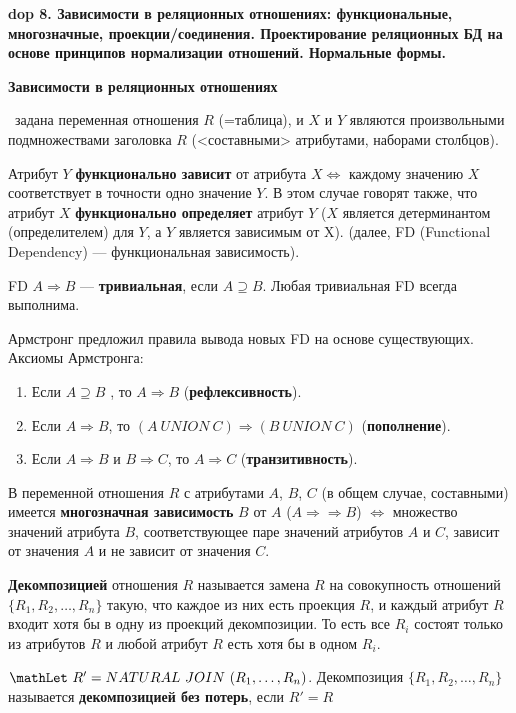 \textbf{\LARGE dop 8. Зависимости  в  реляционных  отношениях:  функциональные,  многозначные,  проекции/соединения. Проектирование реляционных БД на основе принципов нормализации отношений. Нормальные формы.}

\textbf{Зависимости в реляционных отношениях}

\mathLet \ задана переменная отношения $R$ (=таблица), и $X$ и $Y$ являются произвольными подмножествами заголовка $R$ (<составными> атрибутами, наборами столбцов).

Атрибут $Y$ \textbf{функционально зависит} от атрибута $X \iff$ каждому значению $X$ соответствует в точности одно значение $Y$.
В этом случае говорят также, что атрибут $X$ \textbf{функционально определяет} атрибут $Y$ ($X$ является детерминантом (определителем) для $Y$, а $Y$ является зависимым от X). (далее, FD (Functional Dependency) --- функциональная зависимость).

FD $A \Rightarrow B$ --- \textbf{тривиальная}, если $A \supseteq B$. 
Любая тривиальная FD всегда выполнима.

Армстронг предложил правила вывода новых FD на основе существующих.
Аксиомы Армстронга:
\begin{enumerate}
    \item Если $A \supseteq B$ , то $A \Rightarrow B$ (\textbf{рефлексивность}).
    \item Если $A \Rightarrow B$, то $(A~UNION~C) \Rightarrow (B~UNION~C)$ (\textbf{пополнение}).
    \item Если $A \Rightarrow B$ и $B \Rightarrow C$, то $A \Rightarrow C$ (\textbf{транзитивность}).
\end{enumerate}


В переменной отношения $R$ с атрибутами $A$, $B$, $C$ (в общем случае, составными) имеется \textbf{многозначная зависимость} $B$ от $A$ ($A \Rightarrow\Rightarrow B$) $\iff$ множество значений атрибута $B$, соответствующее паре значений атрибутов $A$ и $C$, зависит от значения $A$ и не зависит от значения $C$.

\textbf{Декомпозицией} отношения $R$ называется замена $R$ на совокупность отношений $\{R_1, R_2, \dots , R_n\}$ такую, что каждое из них есть проекция $R$, и каждый атрибут $R$ входит хотя бы в одну из проекций декомпозиции.
То есть все $R_i$ состоят только из атрибутов $R$ и любой атрибут $R$ есть хотя бы в одном $R_i$.

$\mathLet ~ R' = NATURAL~JOIN~(R_1, \dots, R_n)$.
Декомпозиция $\{R_1, R_2, \dots , R_n\}$ называется \textbf{декомпозицией без потерь}, если $R' = R$

